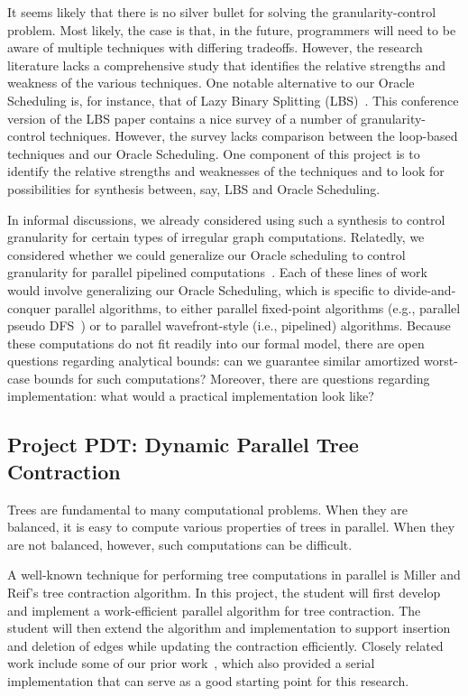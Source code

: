 \documentclass[11pt]{article}
\begin{document}
It seems likely that there is no silver bullet for solving the
granularity-control problem.  Most likely, the case is that, in the
future, programmers will need to be aware of multiple techniques with
differing tradeoffs.  However, the research literature lacks a
comprehensive study that identifies the relative strengths and
weakness of the various techniques.  One notable alternative to our
Oracle Scheduling is, for instance, that of Lazy Binary Splitting
(LBS)~\cite{lazy-binary-splitting,JFP:8669069}.  This conference
version of the LBS paper contains a nice survey of a number of
granularity-control techniques.  However, the survey lacks comparison
between the loop-based techniques and our Oracle Scheduling.  One
component of this project is to identify the relative strengths and
weaknesses of the techniques and to look for possibilities for
synthesis between, say, LBS and Oracle Scheduling.

In informal discussions, we already considered using such a synthesis
to control granularity for certain types of irregular graph
computations.  Relatedly, we considered whether we could generalize
our Oracle scheduling to control granularity for parallel pipelined
computations~\cite{lee2013fly}.  Each of these lines of work would
involve generalizing our Oracle Scheduling, which is specific to
divide-and-conquer parallel algorithms, to either parallel fixed-point
algorithms (e.g., parallel pseudo DFS~\cite{CongKoKrLeSa08}) or to
parallel wavefront-style (i.e., pipelined) algorithms.  Because these
computations do not fit readily into our formal model, there are open
questions regarding analytical bounds: can we guarantee similar
amortized worst-case bounds for such computations?  Moreover, there
are questions regarding implementation: what would a practical
implementation look like?

\subsection{Project  PDT: Dynamic Parallel Tree Contraction}
Trees are fundamental to many computational problems. When they are
balanced, it is easy to compute various properties of trees in
parallel.  When they are not balanced, however, such computations can
be difficult.

A well-known technique for performing tree computations in parallel is
Miller and Reif's tree contraction algorithm.  In this project, the
student will first develop and implement a work-efficient parallel
algorithm for tree contraction.  The student will then extend the
algorithm and implementation to support insertion and deletion of
edges while updating the contraction efficiently.  Closely related
work include some of our prior work~\cite{AcarBlHaViWo04,AcarBlVi05},
which also provided a serial implementation that can serve as a good
starting point for this research.
\end{document}
